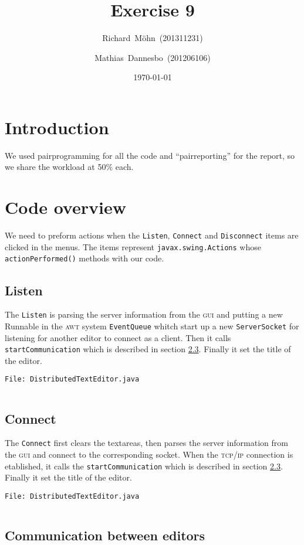 \documentclass[a4paper,draft,12pt,oneside,article,table]{memoir}
\newcommand{\supertitle}[1]{\gdef\suP{#1}}
\newcommand{\subtitle}[1]{\gdef\suB{#1}}
\newcommand{\stunum}[1]{\gdef\stuN{#1}}
\newcommand{\srcpath}{../ex09/src/main/java/ddist}
\newcommand{\inmnt}[3]{\noindent\texttt{\color{gray}File: #3}\vspace{-1em}\inputminted[tabsize=4,firstline=#1,firstnumber=#1,lastline=#2,linenos]{java}{\srcpath/#3}}
\newcommand{\mil}[1]{\texttt{#1}}
\begin{document}
\supertitle{Distributed Systems}
\title{Exercise 9}
\author{Richard~Möhn~\small{(201311231)} \and Mathias~Dannesbo~\small{(201206106)}}
\date{\today}
\maketitle

\chapter{Introduction}
We used pairprogramming for all the code and ``pairreporting'' for the report, so we share the workload at 50\% each.

\chapter{Code overview}
We need to preform actions when the \mil{Listen}, \mil{Connect} and \mil{Disconnect} items are clicked in the menus. The items represent \mil{javax.swing.Actions} whose \mil{actionPerformed()} methods with our code.

\section{Listen}

The \mil{Listen} is parsing the server information from the \textsc{gui} and putting a new Runnable in the \textsc{awt} system \mil{EventQueue} whitch start up a new \mil{ServerSocket} for listening for another editor to connect as a client. Then it calls \mil{startCommunication} which is described in section \ref{sec:com}. Finally it set the title of the editor.

\inmnt{139}{193}{DistributedTextEditor.java}

\section{Connect}
The \mil{Connect} first clears the textareas, then parses the server information from the \textsc{gui} and connect to the corresponding socket. When the \textsc{tcp/ip} connection is etablished, it calls the \mil{startCommunication} which is described in section \ref{sec:com}. Finally it set the title of the editor.

\inmnt{195}{228}{DistributedTextEditor.java}

\section{Communication between editors}
\label{sec:com}
\end{document}
